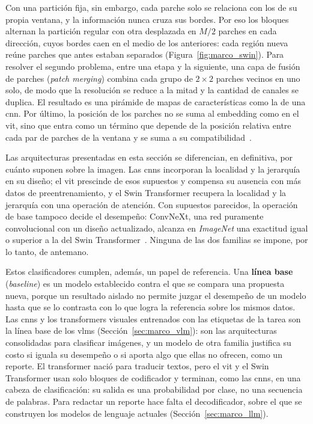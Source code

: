 

Con una partición fija, sin embargo, cada parche solo se relaciona con los de su propia ventana, y la
información nunca cruza sus bordes. Por eso los bloques alternan la partición regular con otra desplazada en
$M/2$ parches en cada dirección, cuyos bordes caen en el medio de los anteriores: cada región nueva reúne parches
que antes estaban separados (Figura~\ref{fig:marco_swin}). Para resolver el segundo problema, entre una etapa y la siguiente, una capa de
fusión de parches (\emph{patch merging})
combina cada grupo de $2 \times 2$ parches vecinos en uno solo, de modo que la resolución se reduce a la mitad
y la cantidad de canales se duplica. El resultado es una pirámide de mapas de características como la de una
\gls{cnn}. Por último, la posición de los parches no se suma al embedding como en el \gls{vit}, sino
que entra como un término que depende de la posición relativa entre cada par de parches de la ventana y se suma
a su compatibilidad~\cite{liu2021swin}.

Las arquitecturas presentadas en esta sección se diferencian, en definitiva, por cuánto suponen sobre la
imagen. Las \glspl{cnn} incorporan la localidad y la jerarquía en su diseño; el \gls{vit} prescinde de esos
supuestos y compensa su ausencia con más datos de preentrenamiento, y el Swin Transformer recupera la localidad
y la jerarquía con una operación de atención. Con supuestos parecidos, la operación de base tampoco decide el
desempeño: ConvNeXt, una red puramente convolucional con un diseño actualizado, alcanza en \emph{ImageNet} una
exactitud igual o superior a la del Swin Transformer~\cite{liu2022convnet}. Ninguna de las dos familias se
impone, por lo tanto, de antemano.

Estos clasificadores cumplen, además, un papel de referencia. Una \textbf{línea base} (\emph{baseline}) es un
modelo establecido contra el que se compara una propuesta nueva, porque un resultado aislado no permite juzgar
el desempeño de un modelo hasta que se lo contrasta con lo que logra la referencia sobre los mismos datos. Las
\glspl{cnn} y los transformers visuales entrenados con las etiquetas de la tarea son la línea base de los
\glspl{vlm} (Sección~\ref{sec:marco_vlm}): son las arquitecturas consolidadas para clasificar imágenes, y un
modelo de otra familia justifica su costo si iguala su desempeño o si aporta algo que ellas no ofrecen, como un
reporte. El transformer nació para traducir textos, pero el \gls{vit} y el Swin Transformer usan solo bloques de
codificador y terminan, como las \glspl{cnn}, en una cabeza de clasificación: su salida es una probabilidad por
clase, no una secuencia de palabras. Para redactar un reporte hace falta el decodificador, sobre el que se
construyen los modelos de lenguaje actuales (Sección~\ref{sec:marco_llm}).

